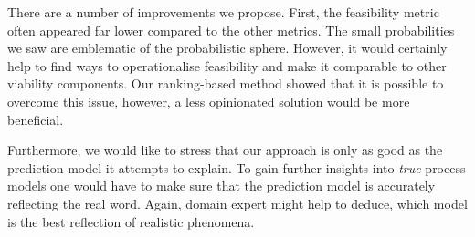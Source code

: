 \documentclass[./../../paper.tex]{subfiles}
\begin{document}
There are a number of improvements we propose. First, the feasibility metric often appeared far lower compared to the other metrics. The small probabilities we saw are emblematic of the probabilistic sphere. However, it would certainly help to find ways to operationalise feasibility and make it comparable to other viability components. Our ranking-based method showed that it is possible to overcome this issue, however, a less opinionated solution would be more beneficial. 

Furthermore, we would like to stress that our approach is only as good as the prediction model it attempts to explain. To gain further insights into \emph{true} process models one would have to make sure that the prediction model is accurately reflecting the real word. Again, domain expert might help to deduce, which model is the best reflection of realistic phenomena.


\end{document}
